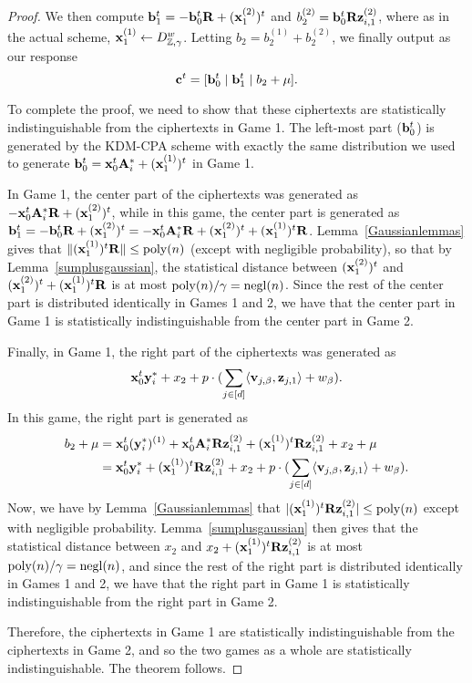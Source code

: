 \begin{proof}
  We then compute $\mathbf{b}_1^t = -\mathbf{b}_0^t\mathbf{R}+(\mathbf{x}_1^{(2)})^t$ and
  $b_2^{(2)} = \mathbf{b}_0^t\mathbf{R}\mathbf{z}_{i,1}^{(2)}$, where as in the actual
  scheme, $\mathbf{x}_1^{(1)} \gets D_{\mathbb{Z},\gamma}^{w}$. Letting $b_2 =
  b_2^{(1)}+b_2^{(2)}$, we finally output as our response
  \[\mathbf{c}^t = [\mathbf{b}_0^t \mid \mathbf{b}_1^t \mid b_2+\mu].\]

  To complete the proof, we need to show that these ciphertexts are
  statistically indistinguishable from the ciphertexts in Game 1. The
  left-most part ($\mathbf{b}_0^t$) is generated by the KDM-CPA scheme with
  exactly the same distribution we used to generate $\mathbf{b}_0^t =
  \mathbf{x}_0^t\mathbf{A}_i^{*}+(\mathbf{x}_1^{(1)})^t$ in Game 1.

  In Game 1, the center part of the ciphertexts was generated as
  $-\mathbf{x}_0^t\mathbf{A}_i^{*}\mathbf{R}+(\mathbf{x}_1^{(2)})^t$, while in this game, the center
  part is generated as
  $\mathbf{b}_1^t=-\mathbf{b}_0^t\mathbf{R}+(\mathbf{x}_1^{(2)})^t=-\mathbf{x}_0^t\mathbf{A}_i^{*}\mathbf{R}+(\mathbf{x}_1^{(2)})^t+(\mathbf{x}_1^{(1)})^t\mathbf{R}$. Lemma~\ref{Gaussianlemmas}
  gives that $\lVert{(\ensuremath{\mathbf{x}}_1^{(1)})^t\ensuremath{\mathbf{R}}}\rVert \leq \operatorname{poly}(n)$ (except with
  negligible probability), so that by Lemma~\ref{sumplusgaussian}, the
  statistical distance between $(\mathbf{x}_1^{(2)})^t$ and
  $(\mathbf{x}_1^{(2)})^t+(\mathbf{x}_1^{(1)})^t\mathbf{R}$ is at most $\operatorname{poly}(n)/\gamma =
  \operatorname{negl}(n)$. Since the rest of the center part is distributed
  identically in Games 1 and 2, we have that the center part in Game 1
  is statistically indistinguishable from the center part in Game 2.

  Finally, in Game 1, the right part of the ciphertexts was generated
  as 
  \[\mathbf{x}_0^t\mathbf{y}_i^*+x_2+p\cdot (\sum_{j \in [d]}\langle{\ensuremath{\mathbf{v}}_{j,\beta},
    \ensuremath{\mathbf{z}}_{j,1}}\rangle + w_{\beta}).\] In this game, the right part is
  generated as
 \begin{align*}
  b_2+\mu&=\mathbf{x}_0^t(\mathbf{y}_i^*)^{(1)}+
  \mathbf{x}_0^t\mathbf{A}_i^*\mathbf{R}\mathbf{z}_{i,1}^{(2)}+(\mathbf{x}_1^{(1)})^t\mathbf{R}\mathbf{z}_{i,1}^{(2)}+x_2+\mu\\
  &=\mathbf{x}_0^t\mathbf{y}_i^*+(\mathbf{x}_1^{(1)})^t\mathbf{R}\mathbf{z}_{i,1}^{(2)}+x_2+p\cdot
  (\sum_{j \in [d]}\langle{\ensuremath{\mathbf{v}}_{j, \beta}, \ensuremath{\mathbf{z}}_{j,1}}\rangle + w_{\beta}).\\  
  \end{align*} Now, we
  have by Lemma~\ref{Gaussianlemmas} that
  $|(\mathbf{x}_1^{(1)})^t\mathbf{R}\mathbf{z}_{i,1}^{(2)}| \leq \operatorname{poly}(n)$ except with negligible
  probability. Lemma~\ref{sumplusgaussian} then gives that the
  statistical distance between $x_2$ and
  $x_2+(\mathbf{x}_1^{(1)})^t\mathbf{R}\mathbf{z}_{i,1}^{(2)}$ is at most $\operatorname{poly}(n)/\gamma =
  \operatorname{negl}(n)$, and since the rest of the right part is distributed
  identically in Games 1 and 2, we have that the right part in Game 1
  is statistically indistinguishable from the right part in Game 2.

  Therefore, the ciphertexts in Game 1 are statistically
  indistinguishable from the ciphertexts in Game 2, and so the two
  games as a whole are statistically indistinguishable. The theorem
  follows.
\end{proof}


